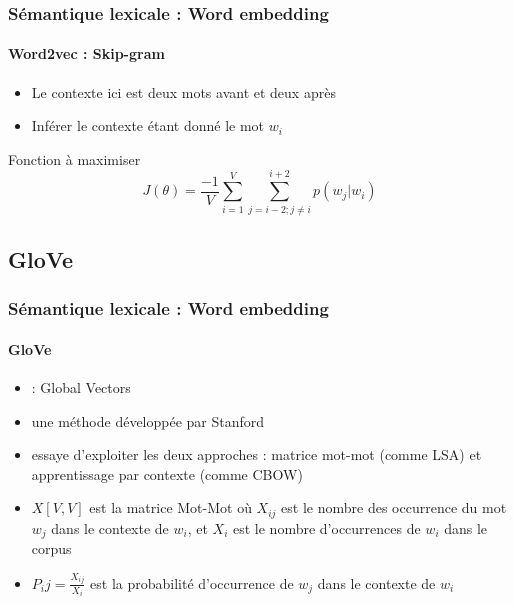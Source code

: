\documentclass[xcolor=table]{beamer}
\begin{document}
\begin{frame}
	\frametitle{Sémantique lexicale : Word embedding}
	\framesubtitle{Word2vec : Skip-gram}
	\begin{minipage}{.58\textwidth}
		\begin{itemize}
			\item Le contexte ici est deux mots avant et deux après
			\item Inférer le contexte étant donné le mot $w_i$
		\end{itemize}
		\begin{block}{Fonction à maximiser}
			\[%
			J(\theta) = \frac{-1}{V} \sum_{i=1}^{V} \sum_{j= i-2; j \ne i}^{i+2} p(w_j |w_i)
			\]
		\end{block}
	\end{minipage}
	\begin{minipage}{.08\textwidth}
	\end{minipage}
	\begin{minipage}{.4\textwidth}
	\end{minipage}
	
\end{frame}

\subsection{GloVe}

\begin{frame}
\frametitle{Sémantique lexicale : Word embedding}
\framesubtitle{GloVe}

\begin{itemize}
	\item {} : Global Vectors
	\item une méthode développée par Stanford \cite{2014-pennington-al}
	\item essaye d'exploiter les deux approches : matrice mot-mot (comme LSA) et apprentissage par contexte (comme CBOW)
	\item $X[V, V]$ est la matrice Mot-Mot où $X_{ij}$ est le nombre des occurrence du mot $w_j$ dans le contexte de $w_i$, et $X_i$ est le nombre d'occurrences de $w_i$ dans le corpus
	\item $P_ij= \frac{X_{ij}}{X_i}$ est la probabilité d'occurrence de $w_j$ dans le contexte de $w_i$
\end{itemize}


\end{frame}
\end{document}
